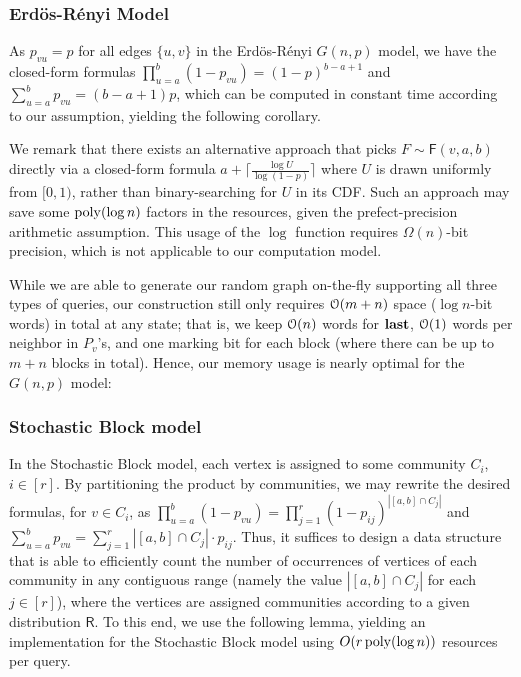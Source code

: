 \subsubsection{Erd\"{o}s-R\'{e}nyi Model}
\label{sec:app_er}
As $p_{vu} = p$ for all edges $\{u,v\}$ in the Erd\"{o}s-R\'{e}nyi $G(n,p)$ model, we have the closed-form formulas $\prod_{u=a}^b (1-p_{vu}) = (1-p)^{b-a+1}$ and $\sum_{u=a}^b p_{vu} = (b-a+1)p$, which can be computed in constant time according to our assumption, yielding the following corollary.

\ERGrand*

We remark that there exists an alternative approach that picks $F\sim\mathsf{F}(v,a,b)$ directly via a closed-form formula $a+\lceil\frac{\log U}{\log (1-p)}\rceil$ where $U$ is drawn uniformly from $[0,1)$, rather than binary-searching for $U$ in its CDF. Such an approach may save some $\mathrm{poly}(\log n)$ factors in the resources, given the prefect-precision arithmetic assumption. This usage of the $\log$ function requires $\Omega(n)$-bit precision, which is not applicable to our computation model.

While we are able to generate our random graph on-the-fly supporting all three types of queries, our construction still only requires $\mathcal{O}(m+n)$ space ($\log n$-bit words) in total at any state; that is, we keep $\mathcal{O}(n)$ words for $\mathbf{last}$, $\mathcal{O}(1)$ words per neighbor in $P_v$'s, and one marking bit for each block (where there can be up to $m+n$ blocks in total). Hence, our memory usage is nearly optimal for the $G(n,p)$ model:

\EROptimal*

\iffalse
The deterministic version (Section~\ref{sec:ER-det}) does not require the extra overhead resulting from failed iterations.
However, the two level data-structure introduces an extra $\Bo(\log n)$ factor, resulting in the same overall running time.
However, this only requires one $N$-bit random word.
\fi





\subsubsection{Stochastic Block model}
\label{sec:application_sbm}
In the Stochastic Block model, each vertex is assigned to some community $C_i$, $i \in [r]$.
By partitioning the product by communities, we may rewrite the desired formulas, for $v \in C_i$,
as $\prod_{u=a}^b (1-p_{vu}) = \prod_{j=1}^r (1-p_{ij})^{|[a,b]\cap C_j|}$ and $\sum_{u=a}^b p_{vu}=\sum_{j=1}^r |[a,b]\cap C_j|\cdot p_{ij}$.
Thus, it suffices to design a data structure that is able to efficiently count the number of occurrences of vertices of each community
in any contiguous range (namely the value $|[a,b]\cap C_j|$ for each $j \in [r]$),
where the vertices are assigned communities according to a given distribution $\mathsf{R}$.
To this end, we use the following lemma,
yielding an implementation for the Stochastic Block model using $O(r\, \mathrm{poly}(\log n))$ resources per query.

